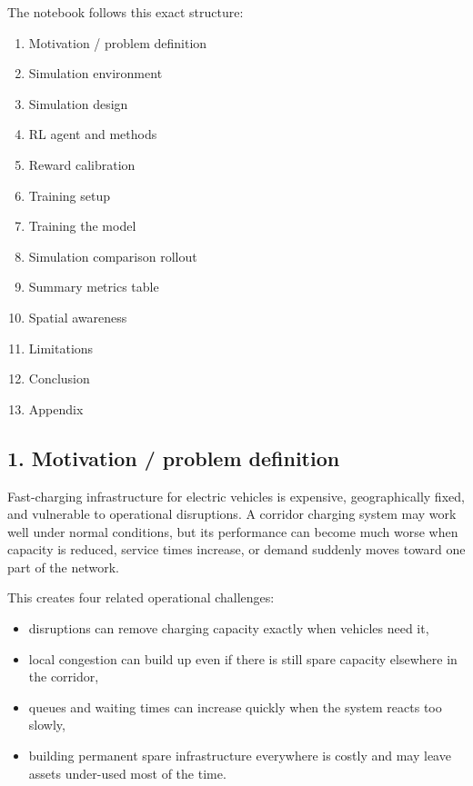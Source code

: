 \documentclass[11pt]{article}
\providecommand{\tightlist}{%
      \setlength{\itemsep}{0pt}\setlength{\parskip}{0pt}}
\begin{document}
The notebook follows this exact structure:

\begin{enumerate}
\def\labelenumi{\arabic{enumi}.}
\tightlist
\item
  Motivation / problem definition\\
\item
  Simulation environment\\
\item
  Simulation design\\
\item
  RL agent and methods\\
\item
  Reward calibration\\
\item
  Training setup\\
\item
  Training the model\\
\item
  Simulation comparison rollout\\
\item
  Summary metrics table\\
\item
  Spatial awareness\\
\item
  Limitations\\
\item
  Conclusion\\
\item
  Appendix
\end{enumerate}

    \subsection{1. Motivation / problem
definition}\label{motivation-problem-definition}

Fast-charging infrastructure for electric vehicles is expensive,
geographically fixed, and vulnerable to operational disruptions. A
corridor charging system may work well under normal conditions, but its
performance can become much worse when capacity is reduced, service
times increase, or demand suddenly moves toward one part of the network.

This creates four related operational challenges:

\begin{itemize}
\tightlist
\item
  disruptions can remove charging capacity exactly when vehicles need
  it,
\item
  local congestion can build up even if there is still spare capacity
  elsewhere in the corridor,
\item
  queues and waiting times can increase quickly when the system reacts
  too slowly,
\item
  building permanent spare infrastructure everywhere is costly and may
  leave assets under-used most of the time.
\end{itemize}
\end{document}
